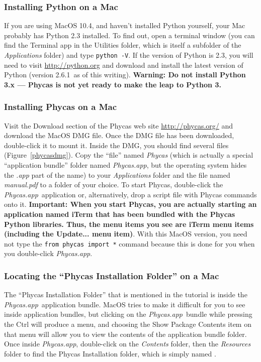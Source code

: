 \documentclass[10pt]{article}
\newcommand{\currPyVersion}{2.6.1}
\newcommand{\pathname}[1]{{\em #1}}				%
\newcommand{\menu}[1]{{\sf #1}}					%
\newcommand{\keycmd}[1]{{\sf #1}}					%
\newcommand{\code}[1]{{\tt #1}}					%
\newcommand{\important}[1]{{\bf Important: #1}}	%
\newcommand{\warning}[1]{{\bf Warning: #1}}		%
\newcommand{\warnNoPyThree}{\warning{Do not install Python 3.x --- Phycas is not yet ready to make the leap to Python 3.}}
\newcommand{\phycasapp}{\pathname{Phycas.app}}
\begin{document}
\subsubsection{Installing Python on a Mac}

If you are using MacOS 10.4, and haven't installed Python yourself, your Mac probably has Python 2.3 installed. To find out, open a terminal window (you can find the Terminal app in the Utilities folder, which is itself a subfolder of the \pathname{Applications} folder) and type \code{python -V}. If the version of Python is 2.3, you will need to visit \url{http://python.org} and download and install the latest version of Python (version \currPyVersion\ as of this writing). \warnNoPyThree

\subsubsection{Installing Phycas on a Mac}

Visit the Download section of the Phycas web site \url{http://phycas.org/} and download the MacOS DMG file. Once the DMG file has been downloaded, double-click it to mount it. Inside the DMG, you should find several files (Figure~\ref{phycasdmg}). Copy the ``file'' named \pathname{Phycas} (which is actually a special ``application bundle'' folder named \phycasapp, but the operating system hides the \pathname{.app} part of the name) to your \pathname{Applications} folder and the file named \pathname{manual.pdf} to a folder of your choice. To start Phycas, double-click the \phycasapp\ application or, alternatively, drop a script file with Phycas commands onto it. \important{When you start Phycas, you are actually starting an application named iTerm that has been bundled with the Phycas Python libraries. Thus, the menu items you see are iTerm menu items (including the \menu{Update...} menu item)}. With this MacOS version, you need not type the \code{from phycas import *} command because this is done for you when you double-click \phycasapp.

\subsubsection{Locating the ``Phycas Installation Folder'' on a Mac} \label{subsubsec:installfoldermac}

The ``Phycas Installation Folder'' that is mentioned in the tutorial is inside the \phycasapp\ application bundle. MacOS tries to make it difficult for you to see inside application bundles, but clicking on the \phycasapp\ bundle while pressing the \keycmd{Ctrl} will produce a menu, and choosing the \menu{Show Package Contents} item on that menu will allow you to view the contents of the application bundle folder. Once inside \phycasapp, double-click on the \pathname{Contents} folder, then the \pathname{Resources} folder to find the Phycas Installation folder, which is simply named .
\end{document}
